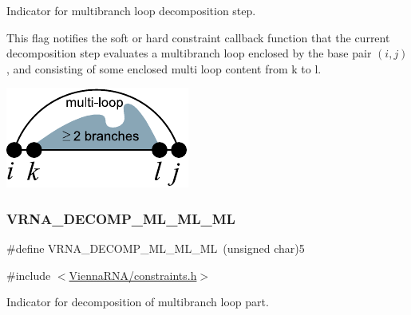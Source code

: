 Indicator for multibranch loop decomposition step. 

This flag notifies the soft or hard constraint callback function that the current decomposition step evaluates a multibranch loop enclosed by the base pair $(i,j)$, and consisting of some enclosed multi loop content from k to l.

 
\begin{DoxyImageNoCaption}
  \mbox{\includegraphics[width=\textwidth,height=\textheight/2,keepaspectratio=true]{decomp_ml}}
\end{DoxyImageNoCaption}
 \mbox{\label{group__constraints_ga735517266f2e35e1374b8f1ea77ef23e}} 
\subsubsection{\texorpdfstring{V\+R\+N\+A\+\_\+\+D\+E\+C\+O\+M\+P\+\_\+\+M\+L\+\_\+\+M\+L\+\_\+\+ML}{VRNA\_DECOMP\_ML\_ML\_ML}}
{\footnotesize\ttfamily \#define V\+R\+N\+A\+\_\+\+D\+E\+C\+O\+M\+P\+\_\+\+M\+L\+\_\+\+M\+L\+\_\+\+ML~(unsigned char)5}



{\ttfamily \#include $<$\hyperlink{constraints_8h}{Vienna\+R\+N\+A/constraints.\+h}$>$}



Indicator for decomposition of multibranch loop part. 

